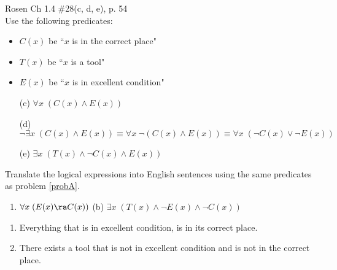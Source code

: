 \begin{questions}
\label{probA} Rosen Ch 1.4 \#28(c, d, e), p. 54 \\
Use the following predicates:
\begin{itemize}[itemsep=0pt,parsep=0pt,topsep=0pt,partopsep=0pt]
    \item $C(x)$ be ``$x$ is in the correct place"
    \item $T(x)$ be ``$x$ is a tool"
    \item $E(x)$ be ``$x$ is in excellent condition"
\end{itemize}
    \ifprintanswers
        \vspace{-12pt}
    \fi
  \begin{solution}
      \begin{itemize}[itemsep=0pt,parsep=0pt,topsep=0pt,partopsep=0pt]
          \item[(c)] $\forall x\; (C(x) \wedge E(x)) $
          \item[(d)] $\neg \exists x\; (C(x) \wedge E(x)) \equiv \forall x\; \neg (C(x) \wedge E(x)) \equiv \forall x\; (\neg C(x) \vee \neg E(x))$
          \item[(e)] $\exists x\; (T(x) \wedge \neg C(x) \wedge E(x))$
      \end{itemize}
  \end{solution}



 Translate the logical expressions into English sentences using the same predicates as problem \ref{probA}.
\begin{enumerate}[label=(\alph*),itemsep=0pt,parsep=0pt,
  topsep=0pt,partopsep=0pt]
    \item $\forall x\; (E(x) \ra C(x))$ \hspace*{1in} (b) $\exists x\; (T(x) \wedge \neg E(x) \wedge \neg C(x))$ 
\end{enumerate}
  \ifprintanswers
        \vspace{-12pt}
    \fi
  \begin{solution}
  \begin{enumerate}[label=(\alph*),itemsep=0pt,parsep=0pt,
  topsep=0pt,partopsep=0pt]
      \item Everything that is in excellent condition, is in its correct place.
      \item There exists a tool that is not in excellent condition and is not in the correct place.
    \end{enumerate}
  \end{solution}



\end{questions}
